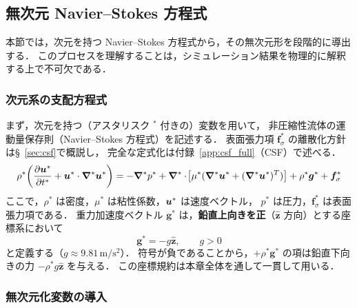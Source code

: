 %
%
\subsection{無次元 Navier--Stokes 方程式}
\label{sec:nondim}

本節では，次元を持つ Navier--Stokes 方程式から，その無次元形を段階的に導出する．
このプロセスを理解することは，シミュレーション結果を物理的に解釈する上で不可欠である．

\subsubsection{次元系の支配方程式}

まず，次元を持つ（アスタリスク $^*$ 付きの）変数を用いて，
非圧縮性流体の運動量保存則（Navier--Stokes 方程式）を記述する．
表面張力項 $\bm{f}_\sigma^*$ の離散化方針は§~\ref{sec:csf}で概説し，
完全な定式化は付録~\ref{app:csf_full}（CSF）で述べる．
\begin{equation}
 \rho^*\!\left(\dfrac{\partial \bm{u}^*}{\partial t^*}+\bm{u}^*\cdot\bm{\nabla}^*\bm{u}^*\right)
 =-\bm{\nabla}^* p^* + \bm{\nabla}^*\cdot\!\left[\mu^*(\bm{\nabla}^*\bm{u}^*+(\bm{\nabla}^*\bm{u}^*)^T)\right]
 +\rho^*\bm{g}^* + \bm{f}_\sigma^*
 \label{eq:NS_dim}
\end{equation}
ここで，$\rho^*$ は密度，$\mu^*$ は粘性係数，$\bm{u}^*$ は速度ベクトル，
$p^*$ は圧力，$\bm{f}_\sigma^*$ は表面張力項である．
重力加速度ベクトル $\bm{g}^*$ は，\textbf{鉛直上向きを正}（$\hat{\bm{z}}$ 方向）とする座標系において
\begin{equation}
  \bm{g}^* = -g\hat{\bm{z}}, \qquad g > 0
  \label{eq:gravity_convention}
\end{equation}
と定義する（$g \approx 9.81\,\mathrm{m/s^2}$）．
符号が負であることから，$+\rho^*\bm{g}^*$ の項は鉛直下向きの力 $-\rho^* g\hat{\bm{z}}$ を与える．
この座標規約は本章全体を通して一貫して用いる．

\subsubsection{無次元化変数の導入}

